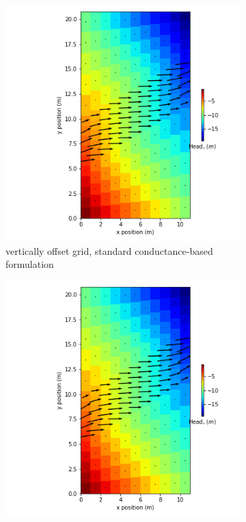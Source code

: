 \documentclass{article}
\begin{document}
\begin{figure}[H]
\centering
\begin{subfigure}{0.4\textwidth}
	\includegraphics[width=\textwidth]{../figures/disu-d-af-vo-s-head.png}
	\caption{vertically offset grid, standard conductance-based formulation}
	\label{fig:disu-s-nocc-head}
\end{subfigure}
\hfill
\begin{subfigure}{0.4\textwidth}
	\includegraphics[width=\textwidth]{../figures/disu-d-af-vo-x-head.png}

\end{subfigure}
\end{figure}
\end{document}

